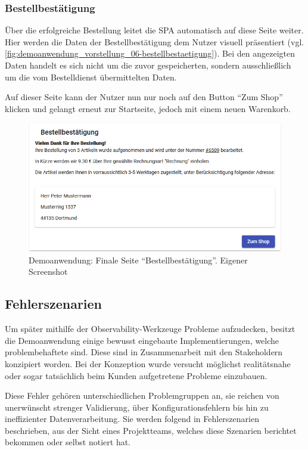 \subsubsection{Bestellbestätigung}

Über die erfolgreiche Bestellung leitet die SPA automatisch auf diese Seite weiter. Hier werden die Daten der Bestellbestätigung dem Nutzer visuell präsentiert (vgl. \autoref{fig:demoanwendung_vorstellung_06-bestellbestaetigung}). Bei den angezeigten Daten handelt es sich nicht um die zuvor gespeicherten, sondern ausschließlich um die vom Bestelldienst übermittelten Daten.

Auf dieser Seite kann der Nutzer nun nur noch auf den Button \enquote{Zum Shop} klicken und gelangt erneut zur Startseite, jedoch mit einem neuen Warenkorb.

\begin{figure}[H]
	\centering
	\includegraphics[width=0.75\linewidth]{img/04_erstellung-poc/demoanwendung_vorstellung_06-bestellbestaetigung.png}
	\caption{Demoanwendung: Finale Seite \enquote{Bestellbestätigung}. Eigener Screenshot}
	\label{fig:demoanwendung_vorstellung_06-bestellbestaetigung}
\end{figure}

\subsection{Fehlerszenarien}
\label{subsec:fehlerszenarien}

Um später mithilfe der Observability-Werkzeuge Probleme aufzudecken, besitzt die Demoanwendung einige bewusst eingebaute Implementierungen, welche problembehaftete sind. Diese sind in Zusammenarbeit mit den Stakeholdern konzipiert worden. Bei der Konzeption wurde versucht möglichst realitätsnahe oder sogar tatsächlich beim Kunden aufgetretene Probleme einzubauen.

Diese Fehler gehören unterschiedlichen Problemgruppen an, sie reichen von unerwünscht strenger Validierung, über Konfigurationsfehlern bis hin zu ineffizienter Datenverarbeitung. Sie werden folgend in Fehlerszenarien beschrieben, aus der Sicht eines Projektteams, welches diese Szenarien berichtet bekommen oder selbst notiert hat.


